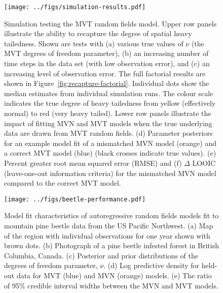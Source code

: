 \documentclass[12pt,english]{article}
\begin{document}
\begin{spacing}{1.3}
\clearpage

\begin{figure}[htb]
  \begin{center}
    \texttt{[image: ../figs/simulation-results.pdf]}
    \caption{Simulation testing the MVT random fields model.
      Upper row
      panels illustrate the ability to recapture the
      degree of spatial heavy tailedness.
      Shown are tests with
      (a) various true values of $\nu$ (the MVT degrees of freedom parameter),
      (b) an increasing number of time steps in the data set (with low observation error),
      and (c) an increasing level of observation error.
      The full factorial results are shown in Figure~\ref{fig:recapture-factorial}.
      Individual dots show the median estimates from individual simulation runs.
      The colour scale indicates the true degree of heavy tailedness from
      yellow (effectively normal) to red (very heavy tailed).
      Lower row panels illustrate the impact of fitting MVN and MVT models
      when the true underlying data are drawn from MVT random fields.
      (d) Parameter posteriors for an
      example model fit of a mismatched MVN model (orange)
      and a correct MVT model (blue) (black crosses indicate true values).
      (e) Percent greater root mean squared error (RMSE)
      and (f) $\Delta$ LOOIC (leave-one-out information criteria)
      for the mismatched MVN model compared to the correct MVT model.
    }
    \label{fig:recapture}
  \end{center}
\end{figure}

\begin{figure}[htb]
  \begin{center}
    \texttt{[image: ../figs/beetle-performance.pdf]}
    \caption{
      Model fit characteristics of autoregressive random fields
      models fit to mountain pine beetle data from the US Pacific Northwest.
      (a) Map of the region with individual observations for one year shown with
      brown dots.
      (b) Photograph of a pine beetle infested forest in British Columbia, Canada.
      (c) Posterior and prior distributions of the degrees of freedom parameter, $\nu$.
      (d) Log predictive density for held-out data for MVT (blue) and MVN (orange) models.
      (e) The ratio of 95\% credible interval widths between the MVN and MVT models.
    }
    \label{fig:map-etc}
  \end{center}
\end{figure}


\end{spacing}
\end{document}
